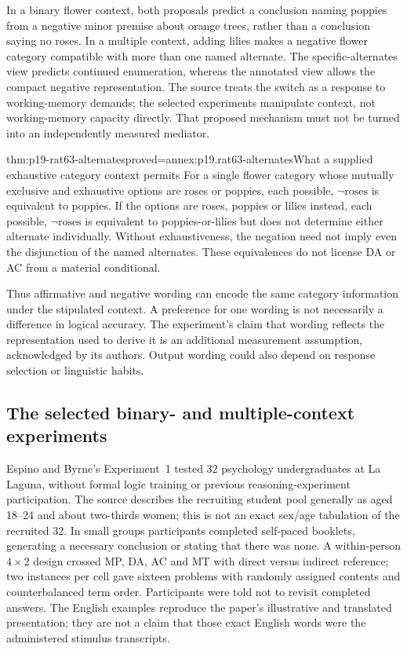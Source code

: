 In a binary flower context, both proposals predict a conclusion naming
poppies from a negative minor premise about orange trees, rather than
a conclusion saying no roses. In a multiple context, adding lilies
makes a negative flower category compatible with more than one named
alternate. The specific-alternates view predicts continued enumeration,
whereas the annotated view allows the compact negative representation.
The source treats the switch as a response to working-memory demands;
the selected experiments manipulate context, not working-memory capacity
directly. That proposed mechanism must not be turned into an independently
measured mediator.

\begin{hblemma}{thm:p19-rat63-alternates}{proved=annex:p19.rat63-alternates}{What a supplied exhaustive category context permits}
For a single flower category whose mutually exclusive and exhaustive
options are roses or poppies, each possible, \(\neg\text{roses}\)
is equivalent to poppies. If the options are roses, poppies or lilies
instead, each possible,
\(\neg\text{roses}\) is equivalent to poppies-or-lilies but does
not determine either alternate individually. Without exhaustiveness,
the negation need not imply even the disjunction of the named alternates.
These equivalences do not license DA or AC from a material conditional.
\end{hblemma}

Thus affirmative and negative wording can encode the same category
information under the stipulated context. A preference for one wording
is not necessarily a difference in logical accuracy. The experiment's
claim that wording reflects the representation used to derive it is an
additional measurement assumption, acknowledged by its authors. Output
wording could also depend on response selection or linguistic habits.

\subsection{The selected binary- and multiple-context experiments}

Espino and Byrne's Experiment~1 tested 32 psychology undergraduates at
La Laguna, without formal logic training or previous reasoning-experiment
participation. The source describes the recruiting student pool generally
as aged 18--24 and about two-thirds women; this is not an exact sex/age
tabulation of the recruited 32. In small groups participants completed
self-paced booklets, generating a necessary conclusion or stating that
there was none. A within-person \(4\times2\) design crossed MP, DA,
AC and MT with direct versus indirect reference; two instances per cell
gave sixteen problems with randomly assigned contents and counterbalanced
term order. Participants were told not to revisit completed answers.
The English examples reproduce the paper's illustrative and translated
presentation; they are not a claim that those exact English words were
the administered stimulus transcripts.
\cite[EarlyView pp.~11--15]{EspinoByrne2018Negation}

